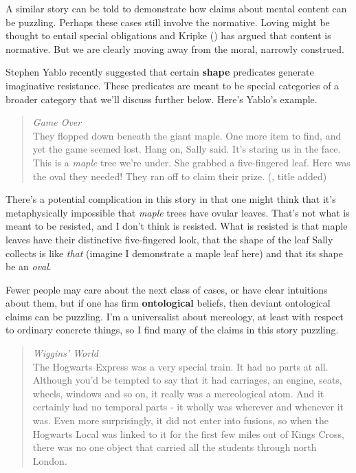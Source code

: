 \documentclass[
  11pt,
  letterpaper,
  DIV=11,
  numbers=noendperiod,
  twoside]{scrartcl}
\begin{document}
A similar story can be told to demonstrate how claims about mental
content can be puzzling. Perhaps these cases still involve the
normative. Loving might be thought to entail special obligations and
Kripke () has argued that content is
normative. But we are clearly moving away from the moral, narrowly
construed.

Stephen Yablo recently suggested that certain \textbf{shape} predicates
generate imaginative resistance. These predicates are meant to be
special categories of a broader category that we'll discuss further
below. Here's Yablo's example.

\begin{quote}
\emph{Game Over}\\
They flopped down beneath the giant maple. One more item to find, and
yet the game seemed lost. Hang on, Sally said. It's staring us in the
face. This is a \emph{maple} tree we're under. She grabbed a
five-fingered leaf. Here was the oval they needed! They ran off to claim
their prize. (, title added)
\end{quote}

There's a potential complication in this story in that one might think
that it's metaphysically impossible that \emph{maple} trees have ovular
leaves. That's not what is meant to be resisted, and I don't think is
resisted. What is resisted is that maple leaves have their distinctive
five-fingered look, that the shape of the leaf Sally collects is like
\emph{that} (imagine I demonstrate a maple leaf here) and that its shape
be an \emph{oval}.

Fewer people may care about the next class of cases, or have clear
intuitions about them, but if one has firm \textbf{ontological} beliefs,
then deviant ontological claims can be puzzling. I'm a universalist
about mereology, at least with respect to ordinary concrete things, so I
find many of the claims in this story puzzling.

\begin{quote}
\emph{Wiggins' World}\\
The Hogwarts Express was a very special train. It had no parts at all.
Although you'd be tempted to say that it had carriages, an engine,
seats, wheels, windows and so on, it really was a mereological atom. And
it certainly had no temporal parts - it wholly was wherever and whenever
it was. Even more surprisingly, it did not enter into fusions, so when
the Hogwarts Local was linked to it for the first few miles out of Kings
Cross, there was no one object that carried all the students through
north London.
\end{quote}
\end{document}
